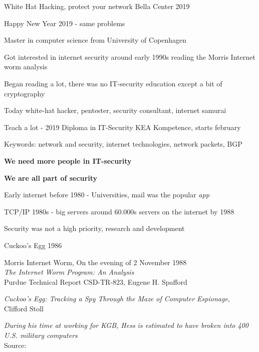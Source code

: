 \documentclass[Screen16to9,17pt,footrule]{foils}
\begin{document}
\mytitlepage
{White Hat Hacking, protect your network}
{Bella Center 2019}

\centerline{Happy New Year 2019 - same problems}



\begin{list2}
\item Master in computer science from University of Copenhagen
\item Got interested in internet security around early 1990s reading the Morris Internet worm analysis
\item Began reading a lot, there was no IT-security education except a bit of cryptography
\item Today white-hat hacker, pentester, security consultant, internet samurai
\item Teach a lot - 2019 Diploma in IT-Security KEA Kompetence, starts february
\item Keywords: network and security, internet technologies, network packets, BGP
\item {\bf We need more people in IT-security}
\end{list2}

\vskip 5mm
\centerline{\bf\Large We are all part of security}


\begin{list1}
\item Early internet before 1980 - Universities, mail was the popular \emph{app}
\item TCP/IP 1980s - big servers around 60.000s servers on the internet by 1988
\item Security was not a high priority, research and development
\begin{list2}
\item Cuckoo's Egg 1986
\item Morris Internet Worm, On the evening of 2 November 1988\\
\emph{The Internet Worm Program: An Analysis}\\
Purdue Technical Report CSD-TR-823, Eugene H. Spafford
\end{list2}
\end{list1}



\begin{list1}
\item
\emph{Cuckoo's Egg: Tracking a Spy Through the Maze of Computer
 Espionage},\\  Clifford Stoll
\item \emph{During his time at working for KGB, Hess is estimated to have broken into 400 U.S. military computers}\\
Source: 
\end{list1}
\end{document}
